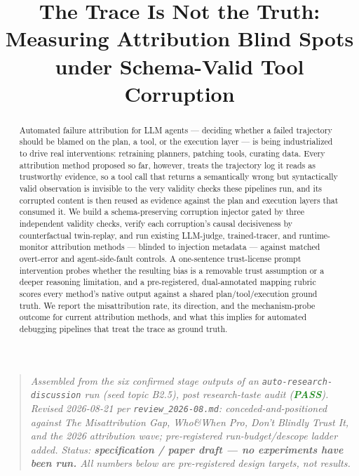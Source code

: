 \documentclass[11pt]{article}
\title{\textbf{The Trace Is Not the Truth:\\ Measuring Attribution Blind Spots under Schema-Valid Tool Corruption}}
\author{}
\date{}
\begin{document}
\maketitle
\vspace{-2em}

\begin{quote}
\small\textit{Assembled from the six confirmed stage outputs of an \texttt{auto-research-discussion} run (seed topic B2.5), post research-taste audit (\textcolor{ForestGreen}{\textbf{PASS}}). Revised 2026-08-21 per \texttt{review\_2026-08.md}: conceded-and-positioned against The Misattribution Gap, Who\&When Pro, Don't Blindly Trust It, and the 2026 attribution wave; pre-registered run-budget/descope ladder added. Status: \textbf{specification / paper draft --- no experiments have been run.} All numbers below are pre-registered design targets, not results.}
\end{quote}

\begin{abstract}
Automated failure attribution for LLM agents --- deciding whether a failed trajectory should be blamed on the plan, a tool, or the execution layer --- is being industrialized to drive real interventions: retraining planners, patching tools, curating data. Every attribution method proposed so far, however, treats the trajectory log it reads as trustworthy evidence, so a tool call that returns a semantically wrong but syntactically valid observation is invisible to the very validity checks these pipelines run, and its corrupted content is then reused as evidence against the plan and execution layers that consumed it. We build a schema-preserving corruption injector gated by three independent validity checks, verify each corruption's causal decisiveness by counterfactual twin-replay, and run existing LLM-judge, trained-tracer, and runtime-monitor attribution methods --- blinded to injection metadata --- against matched overt-error and agent-side-fault controls. A one-sentence trust-license prompt intervention probes whether the resulting bias is a removable trust assumption or a deeper reasoning limitation, and a pre-registered, dual-annotated mapping rubric scores every method's native output against a shared plan/tool/execution ground truth. We report the misattribution rate, its direction, and the mechanism-probe outcome for current attribution methods, and what this implies for automated debugging pipelines that treat the trace as ground truth.
\end{abstract}
\end{document}
